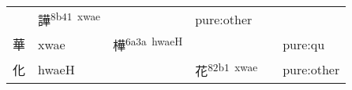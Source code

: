 \documentclass[14pt,a4paper]{scrartcl}
\begin{document}
\begin{longtable}[c]{@{}llllll@{}}
\begin{minipage}[t]{0.14\columnwidth}
\strut\end{minipage} &
\begin{minipage}[t]{0.14\columnwidth}\raggedright\strut
譁\textsuperscript{8b41~xwae}
\strut\end{minipage} &
\begin{minipage}[t]{0.14\columnwidth}\raggedright\strut
\strut\end{minipage} &
\begin{minipage}[t]{0.14\columnwidth}\raggedright\strut
pure:other
\strut\end{minipage}\tabularnewline
\begin{minipage}[t]{0.14\columnwidth}\raggedright\strut
華
\strut\end{minipage} &
\begin{minipage}[t]{0.14\columnwidth}\raggedright\strut
xwae
\strut\end{minipage} &
\begin{minipage}[t]{0.14\columnwidth}\raggedright\strut
樺\textsuperscript{6a3a~hwaeH}
\strut\end{minipage} &
\begin{minipage}[t]{0.14\columnwidth}\raggedright\strut
\strut\end{minipage} &
\begin{minipage}[t]{0.14\columnwidth}\raggedright\strut
\strut\end{minipage} &
\begin{minipage}[t]{0.14\columnwidth}\raggedright\strut
pure:qu
\strut\end{minipage}\tabularnewline
\begin{minipage}[t]{0.14\columnwidth}\raggedright\strut
化
\strut\end{minipage} &
\begin{minipage}[t]{0.14\columnwidth}\raggedright\strut
hwaeH
\strut\end{minipage} &
\begin{minipage}[t]{0.14\columnwidth}\raggedright\strut
\strut\end{minipage} &
\begin{minipage}[t]{0.14\columnwidth}\raggedright\strut
花\textsuperscript{82b1~xwae}
\strut\end{minipage} &
\begin{minipage}[t]{0.14\columnwidth}\raggedright\strut
\strut\end{minipage} &
\begin{minipage}[t]{0.14\columnwidth}\raggedright\strut
pure:other
\strut\end{minipage}\tabularnewline
\bottomrule
\end{longtable}
\end{document}
